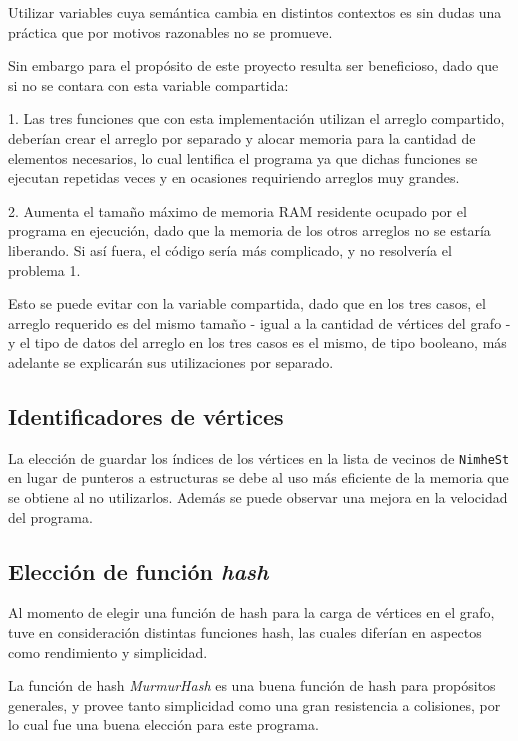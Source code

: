 \documentclass[11pt,a4paper]{article}
\theoremstyle{plain}
\begin{document}
Utilizar variables cuya semántica cambia en distintos contextos es sin dudas una práctica que por motivos razonables no se promueve. 

Sin embargo para el propósito de este proyecto resulta ser beneficioso, dado que si no se contara con esta variable compartida: 

1. Las tres funciones que con esta implementación utilizan el arreglo compartido, deberían crear el arreglo por separado y alocar memoria para la cantidad de elementos necesarios, lo cual lentifica el programa ya que dichas funciones se ejecutan repetidas veces y en ocasiones requiriendo arreglos muy grandes.

2. Aumenta el tamaño máximo de memoria RAM residente ocupado por el programa en ejecución, dado que la memoria de los otros arreglos no se estaría liberando. Si así fuera, el código sería más complicado, y no resolvería el problema 1.

Esto se puede evitar con la variable compartida, dado que en los tres casos, el arreglo requerido es del mismo tamaño - igual a la cantidad de vértices del grafo - y el tipo de datos del arreglo en los tres casos es el mismo, de tipo booleano, más adelante se explicarán sus utilizaciones por separado.

	\subsection{Identificadores de vértices}
	\label{sec:7.7}
	
La elección de guardar los índices de los vértices en la lista de vecinos de \texttt{NimheSt} en lugar de punteros a estructuras se debe al uso más eficiente de la memoria que se obtiene al no utilizarlos. Además se puede observar una mejora en la velocidad del programa. 

	\subsection{Elección de función \emph{hash}}
	\label{sec:7.8}

Al momento de elegir una función de hash para la carga de vértices en el grafo, tuve en consideración distintas funciones hash, las cuales diferían en aspectos como rendimiento y simplicidad.

La función de hash \emph{MurmurHash} es una buena función de hash para propósitos generales, y provee tanto simplicidad como una gran resistencia a colisiones, por lo cual fue una buena elección para este programa.\cite {5}
\end{document}
